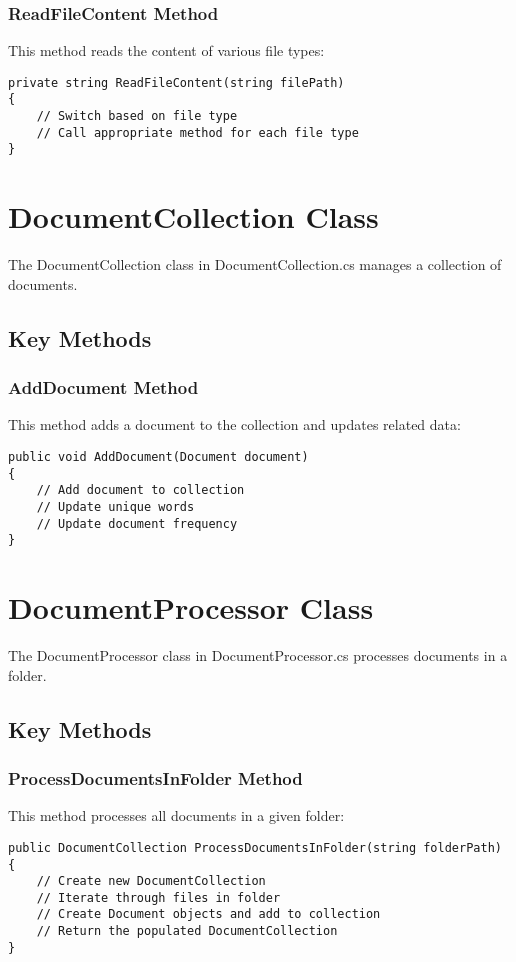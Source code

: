 \documentclass{article}
\begin{document}
\subsubsection{ReadFileContent Method}
This method reads the content of various file types:

\begin{lstlisting}
private string ReadFileContent(string filePath)
{
    // Switch based on file type
    // Call appropriate method for each file type
}
\end{lstlisting}

\section{DocumentCollection Class}
The DocumentCollection class in DocumentCollection.cs manages a collection of documents.

\subsection{Key Methods}
\subsubsection{AddDocument Method}
This method adds a document to the collection and updates related data:

\begin{lstlisting}
public void AddDocument(Document document)
{
    // Add document to collection
    // Update unique words
    // Update document frequency
}
\end{lstlisting}

\section{DocumentProcessor Class}
The DocumentProcessor class in DocumentProcessor.cs processes documents in a folder.

\subsection{Key Methods}
\subsubsection{ProcessDocumentsInFolder Method}
This method processes all documents in a given folder:

\begin{lstlisting}
public DocumentCollection ProcessDocumentsInFolder(string folderPath)
{
    // Create new DocumentCollection
    // Iterate through files in folder
    // Create Document objects and add to collection
    // Return the populated DocumentCollection
}
\end{lstlisting}
\end{document}
